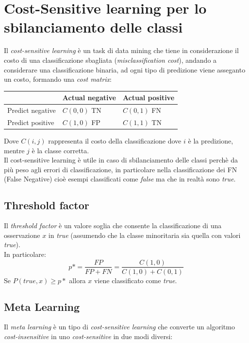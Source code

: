 \documentclass[italian,12pt,a4paper]{article}
\begin{document}
	\section{Cost-Sensitive learning per lo sbilanciamento delle classi}
	Il \textit{cost-sensitive learning} è un task di data mining che tiene in considerazione il costo di una classificazione sbagliata (\textit{misclassification cost}), andando a considerare una classificazione binaria, ad ogni tipo di predizione viene asseganto un costo, formando una \textit{cost matrix}: \\
	\begin{center}
		\begin{tabularx}{0.8\textwidth} { 
				| >{\centering\arraybackslash}X 
				| >{\centering\arraybackslash}X 
				| >{\centering\arraybackslash}X | }
			\hline
			 & Actual negative & Actual positive \\
			\hline
			Predict negative & $C(0, 0)$ TN & $C(0, 1)$ FN \\
			\hline
			Predict positive  & $C(1, 0)$ FP & $C(1, 1)$ TN \\
			\hline
		\end{tabularx}
	\end{center}

	Dove $C(i, j)$ rappresenta il costo della classificazione dove $i$ è la predizione, mentre $j$ è la classe corretta. \\
	Il cost-sensitive learning è utile in caso di sbilanciamento delle classi perchè da più peso agli errori di classificazione, in particolare nella classificazione dei FN (False Negative) cioè esempi classificati come \textit{false} ma che in realtà sono \textit{true}.
	
	\subsection{Threshold factor}
	Il \textit{threshold factor} è un valore soglia che consente la classificazione di una osservazione $x$ in \textit{true} (assumendo che la classe minoritaria sia quella con valori \textit{true}). \\
	In particolare: $$p* = \frac{FP}{FP + FN} = \frac{C(1, 0)}{C(1, 0) + C(0, 1)}$$
	Se $P(true, x) \ge p*$ allora $x$ viene classificato come \textit{true}.
	
	\subsection{Meta Learning}
	Il \textit{meta learning} è un tipo di \textit{cost-sensitive learning} che converte un algoritmo \textit{cost-insensitive} in uno \textit{cost-sensitive} in due modi diversi:
	
\end{document}

